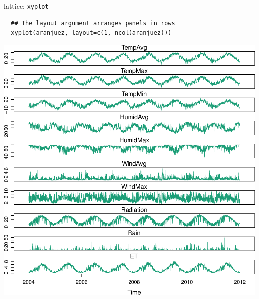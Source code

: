 \documentclass[xcolor={usenames,svgnames,dvipsnames}]{beamer}
\begin{document}
\begin{frame}[fragile,label=sec-2-2-1]{lattice: \texttt{xyplot}}
 \lstset{language=R,label= ,caption= ,numbers=none}
\begin{lstlisting}
  ## The layout argument arranges panels in rows
  xyplot(aranjuez, layout=c(1, ncol(aranjuez)))
\end{lstlisting}
\end{frame}
\begin{frame}[label=sec-2-2-2]{}
\includegraphics[width=.9\linewidth]{figs/aranjuez.pdf}
\end{frame}
\end{document}
